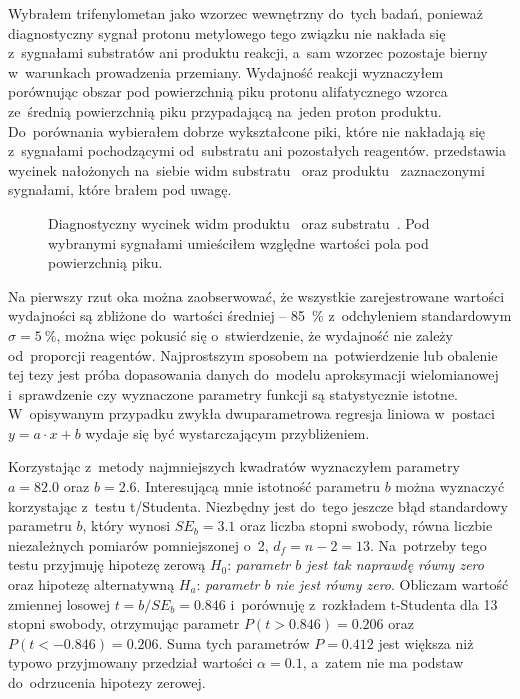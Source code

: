 Wybrałem trifenylometan jako wzorzec wewnętrzny do~tych badań, ponieważ diagnostyczny
  sygnał protonu metylowego tego związku
  nie nakłada się z~sygnałami substratów ani produktu reakcji,
  a~sam wzorzec pozostaje bierny w~warunkach prowadzenia przemiany.
Wydajność reakcji wyznaczyłem porównując obszar pod powierzchnią piku protonu alifatycznego
  wzorca ze~średnią powierzchnią piku przypadającą na~jeden proton produktu.
Do~porównania wybierałem dobrze wykształcone piki, które nie nakładają się z~sygnałami
  pochodzącymi od~substratu ani pozostałych reagentów.
 przedstawia wycinek nałożonych na~siebie widm
  substratu~ oraz produktu~ zaznaczonymi sygnałami,
  które brałem pod uwagę.

\begin{figure*}
  
  \caption{
    Diagnostyczny wycinek widm \NMR*{} produktu~
      oraz substratu~.
    Pod wybranymi sygnałami umieściłem względne wartości pola pod powierzchnią piku.
  }\label{fig:suagr-opt-hnmr}
\end{figure*}

Na pierwszy rzut oka można zaobserwować, że wszystkie zarejestrowane wartości wydajności
  są zbliżone do~wartości średniej \--- \SI{85}{\percent} z~odchyleniem standardowym
  $\sigma=\SI{5}{\percent}$, można więc pokusić się o~stwierdzenie, że wydajność nie zależy
  od~proporcji reagentów.
Najprostszym sposobem na~potwierdzenie lub obalenie tej tezy jest próba dopasowania danych
  do~modelu aproksymacji wielomianowej i~sprawdzenie czy wyznaczone parametry funkcji
  są statystycznie istotne.
W~opisywanym przypadku zwykła dwuparametrowa regresja liniowa w~postaci $y = a \cdot x + b$
  wydaje się być wystarczającym przybliżeniem.

Korzystając z~metody najmniejszych kwadratów wyznaczyłem parametry $a = \num{82.0}$
  oraz $b = \num{2.6}$.
Interesującą mnie istotność parametru $b$ można wyznaczyć korzystając z~testu t\-/Studenta.
Niezbędny jest do~tego jeszcze błąd standardowy parametru $b$, który wynosi $SE_b = \num{3.1}$ oraz
  liczba stopni swobody, równa liczbie niezależnych pomiarów pomniejszonej o~2,
  $d_f = n - 2 = 13$.
Na~potrzeby tego testu przyjmuję hipotezę zerową $H_0$: \emph{parametr $b$ jest tak naprawdę
  równy zero} oraz hipotezę alternatywną $H_a$: \emph{parametr $b$ nie jest równy zero}.
Obliczam wartość zmiennej losowej $t = b / SE_b = \num{0.846}$ i~porównuję z~rozkładem t-Studenta
  dla 13 stopni swobody, otrzymując parametr $P(t > \num{0.846}) = \num{0.206}$ oraz
  $P(t < \num{-0.846}) = \num{0.206}$.
Suma tych parametrów $P = \num{0.412}$ jest większa niż typowo przyjmowany przedział wartości
  $\alpha = \num{0.1}$, a~zatem nie ma podstaw do~odrzucenia hipotezy zerowej.
